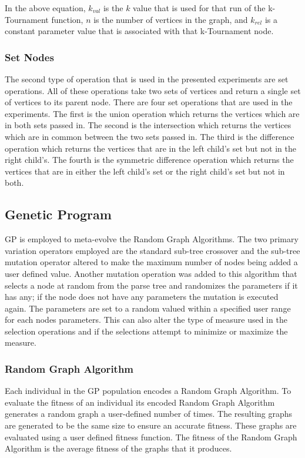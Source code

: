 \documentclass{article}
\begin{document}
In the above equation, $k_{val}$ is the $k$ value that is used for that run of the k-Tournament function, $n$ is the number of vertices in the graph, and $k_{rel}$
is a constant parameter value that is associated with that k-Tournament node.


\subsubsection{Set Nodes}

The second type of operation that is used in the presented experiments are set operations. All of these operations take two sets of vertices and return
a single set of vertices to its parent node. There are four set operations that are used in the experiments. The first is the union operation which returns
the vertices which are in both sets passed in. The second is the intersection which returns the vertices which are in common between the two sets passed in. 
The third is the difference operation which returns the vertices that are in the left child's set but not in the right child's. The fourth is the symmetric
difference operation which returns the vertices that are in either the left child's set or the right child's set but not in both. 


\subsection{Genetic Program}
GP is employed to meta-evolve the Random Graph Algorithms. The two primary variation operators employed are the standard sub-tree crossover and the sub-tree
mutation operator altered to make the maximum number of nodes being added a user defined value. Another mutation operation was added to this algorithm that 
selects a node at random from the parse tree and randomizes the parameters if it has any; if the node does not have any parameters the mutation is executed again. 
The parameters are set to a random valued within a specified user range for each nodes parameters. This can also alter the type of measure used in the selection
operations and if the selections attempt to minimize or maximize the measure. 

\subsubsection{Random Graph Algorithm}
Each individual in the GP population encodes a Random Graph Algorithm. To evaluate the fitness of an individual its encoded Random Graph Algorithm generates
a random graph a user-defined number of times. The resulting graphs are generated to be the same size to ensure an accurate fitness. These graphs are evaluated 
using a user defined fitness function. The fitness of the Random Graph Algorithm is the average fitness of the graphs that it produces. 
\end{document}
